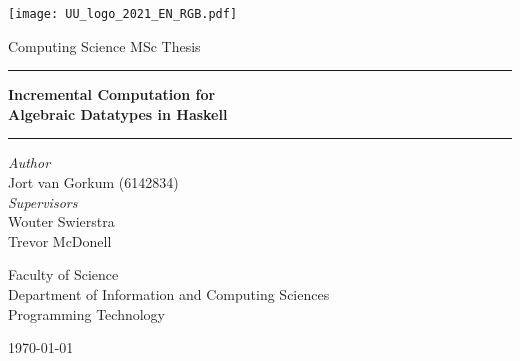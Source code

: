 \begin{titlepage}
  \fontsize{12pt}{15pt}\selectfont
  \begin{center}
    \vspace*{\fill}
    \texttt{[image: UU\_logo\_2021\_EN\_RGB.pdf]}

    \vspace{1.75cm}

    Computing Science MSc Thesis

    \vspace{0.55cm}

    \hrule
    \vspace{0.4cm}
    {
      \fontsize{20.74pt}{20.74pt}\selectfont
      \parbox[]{13cm} {
        \centering
        \textbf{Incremental Computation for \\ Algebraic Datatypes in Haskell}
      }
    }
    \vspace{0.5cm}
    \hrule
      
    \vspace{2.0cm}
    
    \begin{multicols}{2}
      \textit{Author} \\
      Jort van Gorkum (6142834) \\
    \columnbreak
      \textit{Supervisors} \\
      Wouter Swierstra \\
      Trevor McDonell \\
    \end{multicols}

    
    \vspace{2.0cm}

    \begin{small}
      Faculty of Science \\
      Department of Information and Computing Sciences \\
      Programming Technology \\
    \end{small}
    
    \vspace{1.5cm}

    \monthyeardate\today
  \end{center}
\end{titlepage}
